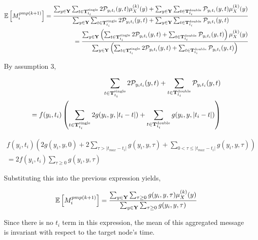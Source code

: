 \begin{align}
\mathbb E\left[{M_{ i}^{pmp(k+1)}}\right] = {\sum_{y\in \bold{Y}}\sum_{t\in\bold{T}_{t_i}^{\text{single}}}2\mathcal{P}_{y_i t_i}(y, t) \mu_{X}^{(k)}(y)+\sum_{y\in \bold{Y}}\sum_{t\in\bold{T}_{t_i}^{\text{double}}}\mathcal{P}_{y_i t_i}(y, t) \mu_{X}^{(k)}(y)\over \sum_{y\in \bold{Y}}\sum_{t\in\bold{T}_{t_i}^{\text{single}}}2\mathcal{P}_{y_i t_i}(y, t)+\sum_{y\in \bold{Y}}\sum_{t\in\bold{T}_{t_i}^{\text{double}}}\mathcal{P}_{y_i t_i}(y, t)}\\={\sum_{y\in \bold{Y}}\left(\sum_{t\in\bold{T}_{t_i}^{\text{single}}}2\mathcal{P}_{y_i t_i}(y, t)+\sum_{t\in\bold{T}_{t_i}^{\text{double}}}\mathcal{P}_{y_i t_i}(y, t)\right)\mu_{X}^{(k)}(y)\over\sum_{y\in \bold{Y}}\left(\sum_{t\in\bold{T}_{t_i}^{\text{single}}}2\mathcal{P}_{y_i t_i}(y, t)+\sum_{t\in\bold{T}_{t_i}^{\text{double}}}\mathcal{P}_{y_i t_i}(y, t)\right)}
\end{align}

By assumption 3,

\begin{align}
\sum_{t\in\bold{T}_{t_i}^{\text{single}}}2\mathcal{P}_{y_i t_i}(y, t)+\sum_{t\in\bold{T}_{t_i}^{\text{double}}}\mathcal{P}_{y_i t_i}(y, t) \\=f(y_i, t_i )\left(\sum_{t\in\bold{T}_{t_i}^{\text{single}}}2g(y_i, y, |t_i - t|)+\sum_{t\in\bold{T}_{t_i}^{\text{double}}}g(y_i, y, |t_i - t|)\right)
\end{align}

\begin{align}
f(y_i, t_i )\left(2g(y_i, y, 0)+2\sum_{\tau>|t_{max}-t_i |}g(y_i, y,\tau)+\sum_{0<\tau\le|t_{max}-t_i|}g(y_i, y, \tau)\right) \\= 2f(y_i, t_i )\sum_{\tau\ge 0}g(y_i, y, \tau)
\end{align}

Substituting this into the previous expression yields,

\begin{align}
\mathbb E\left[{M_{ i}^{pmp(k+1)}}\right]={\sum_{y\in \bold{Y}}\sum_{\tau\ge 0}g(y_i, y, \tau)\mu_{X}^{(k)}(y)\over\sum_{y\in \bold{Y}}\sum_{\tau\ge 0}g(y_i, y, \tau)}
\end{align}

Since there is no $t_i$ term in this expression, the mean of this aggregated message is invariant with respect to the target node's time.














